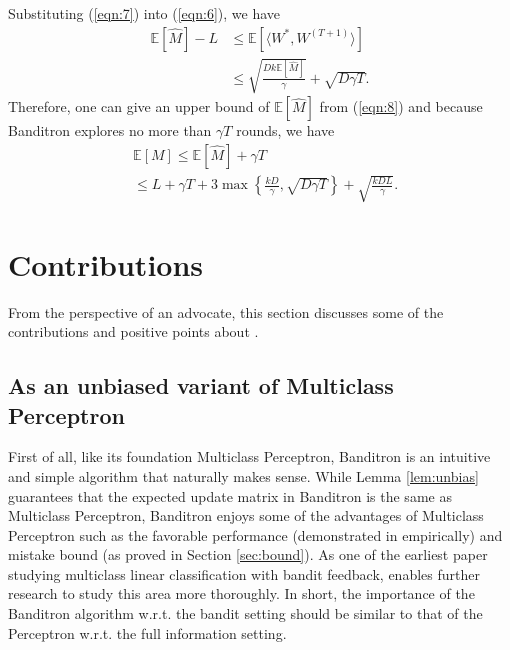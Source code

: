 \documentclass{article}
\begin{document}
Substituting (\ref{eqn:7}) into (\ref{eqn:6}), we have
\begin{equation}\label{eqn:8}
    \begin{aligned}
    \mathbb{E}[\hat{M}]-L&\leq\mathbb{E}[\langle W^*,W^{(T+1)}\rangle]\\
    &\leq\sqrt{\frac{Dk\mathbb{E}[\hat{M}]}{\gamma}}+\sqrt{D\gamma T}.
    \end{aligned}
\end{equation}
Therefore, one can give an upper bound of $\mathbb{E}[\hat{M}]$ from (\ref{eqn:8}) and because Banditron explores no more than $\gamma T$ rounds, we have
\begin{align}
    &\mathbb{E}[M]\leq\mathbb{E}[\hat{M}]+\gamma T\label{eqn:9}\\
    &\leq L+\gamma T+3\max\left\{\frac{kD}{\gamma},\sqrt{D\gamma T}\right\} + \sqrt{\frac{kDL}{\gamma}}.\label{eqn:10}
\end{align}

\section{Contributions}\label{sec:positive}
\vspace{-.05in}
From the perspective of an advocate, this section discusses some of the contributions and positive points about \citet{kakade2008efficient}.

\subsection{As an unbiased variant of Multiclass Perceptron}
First of all, like its foundation Multiclass Perceptron, Banditron is an intuitive and simple algorithm that naturally makes sense. While Lemma \ref{lem:unbias} guarantees that the expected update matrix in Banditron is the same as Multiclass Perceptron, Banditron enjoys some of the advantages of Multiclass Perceptron such as the favorable performance (demonstrated in \citet{kakade2008efficient} empirically) and mistake bound (as proved in Section \ref{sec:bound}). As one of the earliest paper studying multiclass linear classification with bandit feedback, \citet{kakade2008efficient} enables further research to study this area more thoroughly. In short, the importance of the Banditron algorithm w.r.t. the bandit setting should be similar to that of the Perceptron \cite{rosenblatt1958perceptron} w.r.t. the full information setting.
\end{document}
